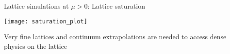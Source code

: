 \begin{frame}{Lattice simulations at \texorpdfstring{$\mu > 0$}{m > 0}: Lattice saturation}

  \begin{center}
    \texttt{[image: saturation\_plot]}
  \end{center}

  Very \alert{fine lattices} and \alert{continuum extrapolations} are needed to
  access dense physics on the lattice

  
\end{frame}
